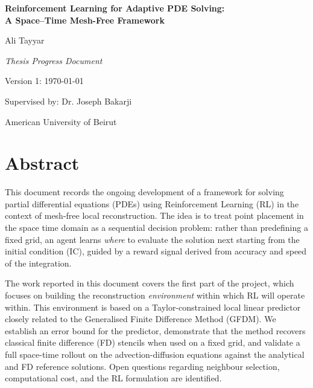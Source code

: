 \documentclass[12pt, a4paper, twoside]{report}
\theoremstyle{plain}
\theoremstyle{definition}
\begin{document}
  

\begin{titlepage}
    \centering
    \vspace*{2cm}
    {\LARGE\bfseries Reinforcement Learning for Adaptive
    PDE Solving:\\[0.4em]
    A Space--Time Mesh-Free Framework\par}
    \vspace{1.5cm}
    {\large Ali Tayyar\par}
    \vspace{0.5cm}
    {\large\itshape Thesis Progress Document\par}
    \vspace{0.3cm}
    {\large Version 1: \today\par}
    \vfill
    {\large Supervised by: Dr. Joseph Bakarji\par}
    \vspace{0.5cm}
    {\large American University of Beirut\par}
\end{titlepage}

\chapter*{Abstract}

This document records the ongoing development of a framework for
solving partial differential equations (PDEs) using Reinforcement
Learning (RL) in the context of mesh-free local reconstruction.
The idea is to treat point placement in the space time
domain as a sequential decision problem: rather than predefining a
fixed grid, an agent learns \emph{where} to evaluate the solution
next starting from the initial condition (IC), guided by a reward signal derived from accuracy and speed of the integration.

The work reported in this document covers the first part of the project, which focuses on building the reconstruction \emph{environment} within which RL will operate within.
This environment is based on a Taylor-constrained local linear
predictor closely related to the Generalised Finite Difference
Method (GFDM).
We establish an error bound for the predictor, demonstrate that the method recovers classical finite difference (FD) stencils when used on a fixed grid, and validate a full space-time rollout on the advection-diffusion equations against the analytical and FD reference solutions.
Open questions regarding neighbour selection, computational cost,
and the RL formulation are identified.
\end{document}
